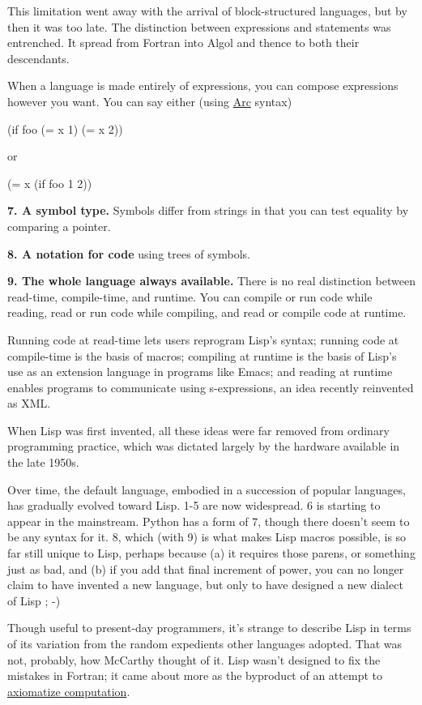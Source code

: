 This limitation went away with the arrival of block-structured
languages, but by then it was too late. The distinction between
expressions and statements was entrenched. It spread from Fortran into
Algol and thence to both their descendants.

When a language is made entirely of expressions, you can compose
expressions however you want. You can say either (using
\href{arc.html}{Arc} syntax)

(if foo (= x 1) (= x 2))

or

(= x (if foo 1 2))

\textbf{7. A symbol type.} Symbols differ from strings in that you can
test equality by comparing a pointer.

\textbf{8. A notation for code} using trees of symbols.

\textbf{9. The whole language always available.} There is no real
distinction between read-time, compile-time, and runtime. You can
compile or run code while reading, read or run code while compiling, and
read or compile code at runtime.

Running code at read-time lets users reprogram Lisp's syntax; running
code at compile-time is the basis of macros; compiling at runtime is the
basis of Lisp's use as an extension language in programs like Emacs; and
reading at runtime enables programs to communicate using s-expressions,
an idea recently reinvented as XML.

When Lisp was first invented, all these ideas were far removed from
ordinary programming practice, which was dictated largely by the
hardware available in the late 1950s.

Over time, the default language, embodied in a succession of popular
languages, has gradually evolved toward Lisp. 1-5 are now widespread. 6
is starting to appear in the mainstream. Python has a form of 7, though
there doesn't seem to be any syntax for it. 8, which (with 9) is what
makes Lisp macros possible, is so far still unique to Lisp, perhaps
because (a) it requires those parens, or something just as bad, and (b)
if you add that final increment of power, you can no longer claim to
have invented a new language, but only to have designed a new dialect of
Lisp ; -)

Though useful to present-day programmers, it's strange to describe Lisp
in terms of its variation from the random expedients other languages
adopted. That was not, probably, how McCarthy thought of it. Lisp wasn't
designed to fix the mistakes in Fortran; it came about more as the
byproduct of an attempt to \href{rootsoflisp.html}{axiomatize
computation}.
